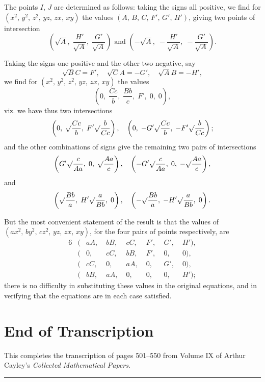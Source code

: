 \documentclass[11pt,a4paper]{book}
\begin{document}
The points $I$, $J$ are determined as follows: taking the signs all positive, we find for $(x^2,\, y^2,\, z^2,\, yz,\, zx,\, xy)$ the values $(A,\, B,\, C,\, F',\, G',\, H')$, giving two points of intersection
\[
\left(\surd A,\; \frac{H'}{\surd A},\; \frac{G'}{\surd A}\right) \text{ and } \left(-\surd A,\; -\frac{H'}{\surd A},\; -\frac{G'}{\surd A}\right).
\]

Taking the signs one positive and the other two negative, say
\[
\surd BC = F',\quad \surd CA = -G',\quad \surd AB = -H',
\]
we find for $(x^2,\, y^2,\, z^2,\, yz,\, zx,\, xy)$ the values
\[
\left(0,\; \frac{Cc}{b},\; \frac{Bb}{c},\; F',\; 0,\; 0\right),
\]
viz. we have thus two intersections
\[
\left(0,\; \surd\frac{Cc}{b},\; F'\surd\frac{b}{Cc}\right),\quad \left(0,\; -G'\surd\frac{Cc}{b},\; -F'\surd\frac{b}{Cc}\right);
\]
and the other combinations of signs give the remaining two pairs of intersections
\[
\left(G'\surd\frac{c}{Aa},\; 0,\; \surd\frac{Aa}{c}\right),\quad \left(-G'\surd\frac{c}{Aa},\; 0,\; -\surd\frac{Aa}{c}\right),
\]
and
\[
\left(\surd\frac{Bb}{a},\; H'\surd\frac{a}{Bb},\; 0\right),\quad \left(-\surd\frac{Bb}{a},\; -H'\surd\frac{a}{Bb},\; 0\right).
\]

But the most convenient statement of the result is that the values of $(ax^2,\, by^2,\, cz^2,\, yz,\, zx,\, xy)$, for the four pairs of points respectively, are
\begin{alignat*}{6}
&(&aA,\; &bB,\; &cC,\; &F',\; &G',\; &H'),\\
&(&0,\; &cC,\; &bB,\; &F',\; &0,\; &0),\\
&(&cC,\; &0,\; &aA,\; &0,\; &G',\; &0),\\
&(&bB,\; &aA,\; &0,\; &0,\; &0,\; &H');
\end{alignat*}
there is no difficulty in substituting these values in the original equations, and in verifying that the equations are in each case satisfied.

\newpage
\section*{End of Transcription}

This completes the transcription of pages 501--550 from Volume IX of Arthur Cayley's \textit{Collected Mathematical Papers}.

\vspace{1em}
\noindent\rule{\textwidth}{0.4pt}
\vspace{0.5em}
\end{document}
